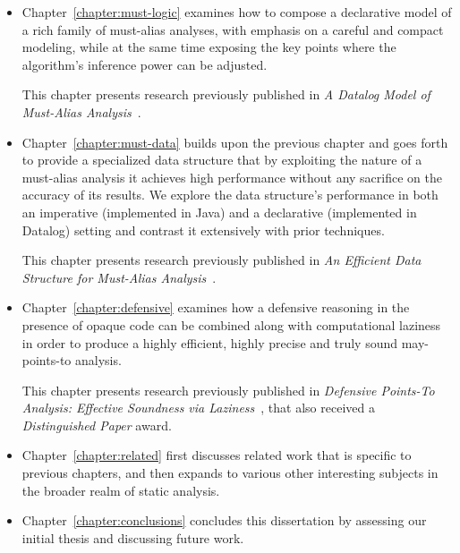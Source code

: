 \begin{itemize}[$\bullet$]
\item Chapter~\ref{chapter:must-logic} examines how to compose a declarative model of a rich family of must-alias analyses, with emphasis on a careful and compact modeling, while at the same time exposing the key points where the algorithm's inference power can be adjusted.

This chapter presents research previously published in \emph{A Datalog Model of Must-Alias Analysis}~\cite{soap:2017:Balatsouras}.

\item Chapter~\ref{chapter:must-data} builds upon the previous chapter and goes forth to provide a specialized data structure that by exploiting the nature of a must-alias analysis it achieves high performance without any sacrifice on the accuracy of its results. We explore the data structure's performance in both an imperative (implemented in Java) and a declarative (implemented in Datalog) setting and contrast it extensively with prior techniques.

This chapter presents research previously published in \emph{An Efficient Data Structure for Must-Alias Analysis}~\cite{cc:2018:Kastrinis}.

\item Chapter~\ref{chapter:defensive} examines how a defensive reasoning in the presence of opaque code can be combined along with computational laziness in order to produce a highly efficient, highly precise and truly sound may-points-to analysis.

This chapter presents research previously published in \emph{Defensive Points-To Analysis: Effective Soundness via Laziness}~\cite{ecoop:2018:Smaragdakis}, that also received a \emph{Distinguished Paper} award.
\end{itemize}

\begin{itemize}[$\bullet$]
\item Chapter~\ref{chapter:related} first discusses related work that is specific to previous chapters, and then expands to various other interesting subjects in the broader realm of static analysis.

\item Chapter~\ref{chapter:conclusions} concludes this dissertation by assessing our initial thesis and discussing future work.
\end{itemize}